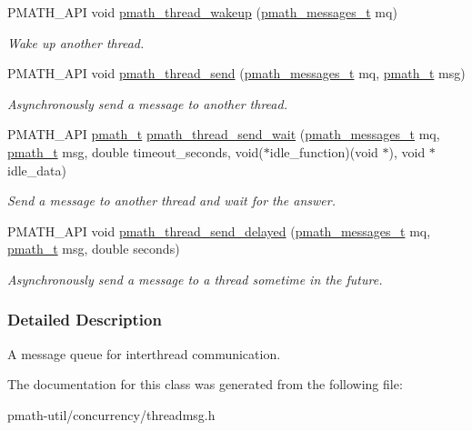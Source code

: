 \begin{CompactItemize}
PMATH\_\-API void \hyperlink{group__threadmsg_gbf90d49f5c42ccaa736ae5e56af6a4a6}{pmath\_\-thread\_\-wakeup} (\hyperlink{classpmath__messages__t}{pmath\_\-messages\_\-t} mq)
\begin{CompactList}\small\item\em Wake up another thread. \item\end{CompactList}\item 
PMATH\_\-API void \hyperlink{group__threadmsg_ga3867a708fb07b86e017e8f201ef7edd}{pmath\_\-thread\_\-send} (\hyperlink{classpmath__messages__t}{pmath\_\-messages\_\-t} mq, \hyperlink{classpmath__t}{pmath\_\-t} msg)
\begin{CompactList}\small\item\em Asynchronously send a message to another thread. \item\end{CompactList}\item 
PMATH\_\-API \hyperlink{classpmath__t}{pmath\_\-t} \hyperlink{group__threadmsg_g4ce8afcfec001a88441bdf8b50bcd157}{pmath\_\-thread\_\-send\_\-wait} (\hyperlink{classpmath__messages__t}{pmath\_\-messages\_\-t} mq, \hyperlink{classpmath__t}{pmath\_\-t} msg, double timeout\_\-seconds, void($\ast$idle\_\-function)(void $\ast$), void $\ast$idle\_\-data)
\begin{CompactList}\small\item\em Send a message to another thread and wait for the answer. \item\end{CompactList}\item 
PMATH\_\-API void \hyperlink{group__threadmsg_g75339d9dd1902293cb72b38e77caa742}{pmath\_\-thread\_\-send\_\-delayed} (\hyperlink{classpmath__messages__t}{pmath\_\-messages\_\-t} mq, \hyperlink{classpmath__t}{pmath\_\-t} msg, double seconds)
\begin{CompactList}\small\item\em Asynchronously send a message to a thread sometime in the future. \item\end{CompactList}\end{CompactItemize}


\subsubsection{Detailed Description}
A message queue for interthread communication. 

The documentation for this class was generated from the following file:\begin{CompactItemize}
\item 
pmath-util/concurrency/threadmsg.h\end{CompactItemize}
